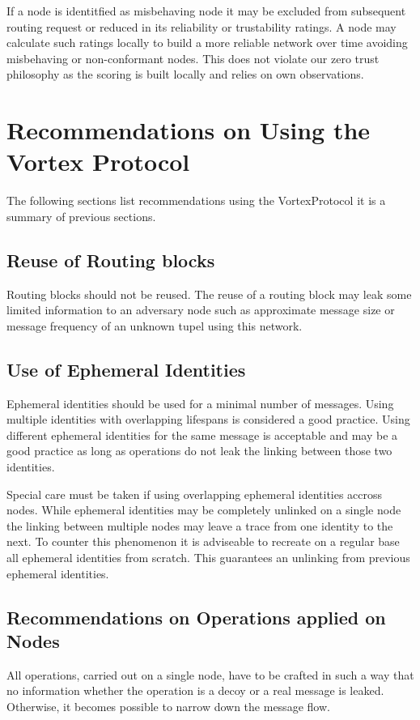If a node is identitfied as misbehaving node it may be excluded from subsequent routing request or reduced in its reliability or trustability ratings. A node may calculate such ratings locally to build a more reliable network over time avoiding misbehaving or non-conformant nodes. This does not violate our zero trust philosophy as the scoring is built locally and relies on own observations.

\chapter{Recommendations on Using the Vortex Protocol}
The following sections list recommendations using the VortexProtocol it is a summary of previous sections.

\section{Reuse of Routing blocks\label{sec:reuseRB}}
Routing blocks should not be reused. The reuse of a routing block may leak some limited information to an adversary node such as approximate message size or message frequency of an unknown tupel using this network.

\section{Use of Ephemeral Identities}
Ephemeral identities should be used for a minimal number of messages. Using multiple identities with overlapping lifespans is considered a good practice. Using different ephemeral identities for the same message is acceptable and may be a good practice as long as operations do not leak the linking between those two identities.

Special care must be taken if using overlapping ephemeral identities accross nodes. While ephemeral identities may be completely unlinked on a single node the linking between multiple nodes may leave a trace from one identity to the next. To counter this phenomenon it is adviseable to recreate on a regular base all ephemeral identities from scratch. This guarantees an unlinking from previous ephemeral identities.

\section{Recommendations on Operations applied on Nodes}
All operations, carried out on a single node, have to be crafted in such a way that no information whether the operation is a decoy or a real message is leaked. Otherwise, it becomes possible to narrow down the message flow.

